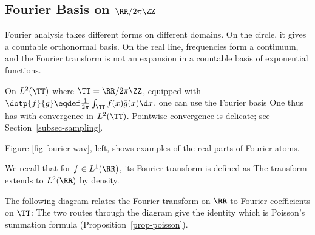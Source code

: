                                                 
\subsection{Fourier Basis on \texorpdfstring{$\RR/2\pi\ZZ$}{the Circle}}

Fourier analysis takes different forms on different domains. On the circle, it gives a countable orthonormal basis. On the real line, frequencies form a continuum, and the Fourier transform is not an expansion in a countable basis of exponential functions.

On $L^2(\TT)$ where $\TT=\RR/2\pi\ZZ$, equipped with $\dotp{f}{g} \eqdef \frac{1}{2\pi}\int_\TT f(x) \bar g(x) \d x$, one can use the Fourier basis 
One thus has
with convergence in $L^2(\TT)$. Pointwise convergence is delicate; see Section~\ref{subsec-sampling}.

Figure \ref{fig-fourier-wav}, left, shows examples of the real parts of Fourier atoms.



We recall that for $f \in L^1(\RR)$, its Fourier transform is defined as
The transform extends to $L^2(\RR)$ by density.

The following diagram relates the Fourier transform on $\RR$ to Fourier coefficients on $\TT$:
The two routes through the diagram give the identity
which is Poisson's summation formula (Proposition~\ref{prop-poisson}).



